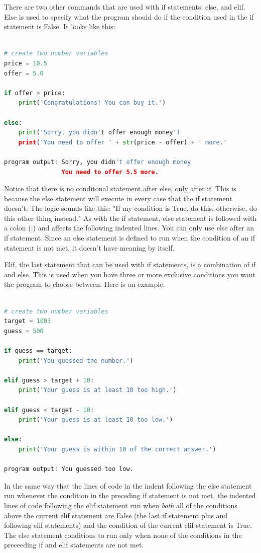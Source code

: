 \documentclass[]{article}
\begin{document}
There are two other commands that are used with if statements: else, and elif. Else is used to specify what the program should do if the condition used in the if statement is False.  It looks like this:

\begin{lstlisting}[language=python]

# create two number variables
price = 10.5
offer = 5.0

if offer > price:
    print('Congratulations! You can buy it.')
    
else:
    print('Sorry, you didn't offer enough money')
    print('You need to offer ' + str(price - offer) + ' more.'

program output: Sorry, you didn't offer enough money
                You need to offer 5.5 more.
\end{lstlisting}

Notice that there is no conditonal statement after else, only after if. This is because the else statement will execute in every case that the if statement doesn't. The logic sounds like this: "If my condition is True, do this, otherwise, do this other thing instead."  As with the if statement, else statement is followed with a colon (:) and affects the following indented lines. You can only use else after an if statement. Since an else statement is defined to run when the condition of an if statement is not met, it doesn't have meaning by itself.

Elif, the last statement that can be used with if statements, is a combination of if and else.  This is used when you have three or more exclusive conditions you want the program to choose between.  Here is an example:

\begin{lstlisting}[language=python]

# create two number variables
target = 1003
guess = 500

if guess == target:
    print('You guessed the number.')
    
elif guess > target + 10:
    print('Your guess is at least 10 too high.')

elif guess < target - 10:
    print('Your guess is at least 10 too low.')
    
else:
    print('Your guess is within 10 of the correct answer.')

program output: You guessed too low.
\end{lstlisting}

In the same way that the lines of code in the indent following the else statement run whenever the condition in the preceding if statement is not met, the indented lines of code following the elif statement run when \textit{both} all of the conditions above the current elif statement are False (the last if statement plus and following elif statements) and the condition of the current elif statement is True. The else statement conditions to run only when none of the conditions in the preceeding if and elif statements are not met. 
\end{document}
